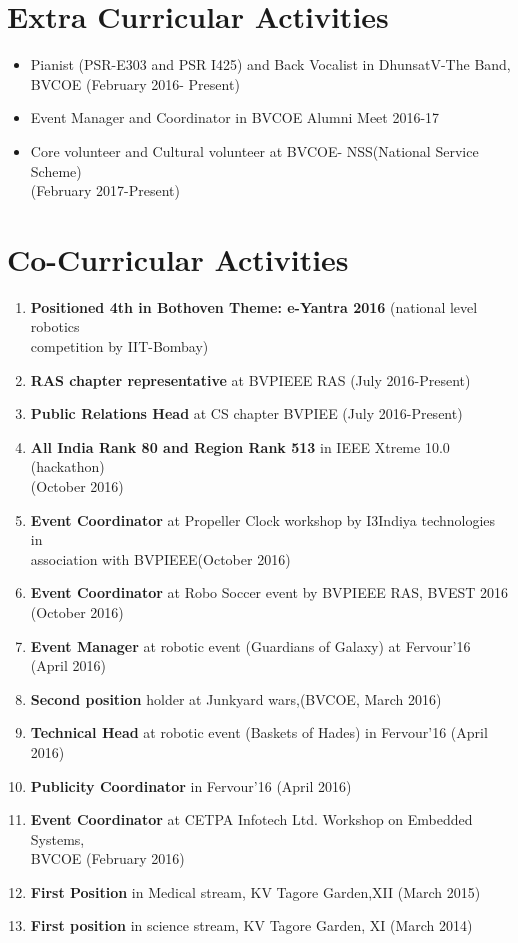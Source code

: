\documentclass[11pt]{article}
\begin{document}
\begin{minipage}{0.80\linewidth}
\section{\color{red}Ext\color{black}ra Curricular Activities}
\begin{itemize}
\item Pianist (PSR-E303 and PSR I425) and Back Vocalist in DhunsatV-The Band,\\ BVCOE (February 2016- Present)
\item Event Manager and Coordinator in BVCOE Alumni Meet 2016-17
\item Core volunteer and Cultural volunteer at BVCOE- NSS(National Service Scheme)\\ (February 2017-Present)
\end{itemize}
\section{\color{green}Co-C\color{black}urricular Activities}
\begin{enumerate}
\item \textbf{Positioned 4th in Bothoven Theme: e-Yantra 2016} (national level robotics \\competition  by IIT-Bombay) 
\item \textbf{RAS chapter representative} at BVPIEEE RAS (July 2016-Present)
\item \textbf{Public Relations Head} at CS chapter BVPIEE (July 2016-Present)
\item \textbf{All India Rank 80 and Region Rank 513} in IEEE Xtreme 10.0 (hackathon) \\(October 2016)
\item \textbf{Event Coordinator} at Propeller Clock workshop by I3Indiya technologies in \\association with BVPIEEE(October 2016)
\item \textbf{Event Coordinator} at Robo Soccer event by BVPIEEE RAS, BVEST 2016 \\(October 2016)
\item \textbf{Event Manager} at robotic event (Guardians of Galaxy) at Fervour'16 (April 2016)
\item \textbf{Second position} holder at Junkyard wars,(BVCOE, March 2016)
\item \textbf{Technical Head} at robotic event (Baskets of Hades) in Fervour'16 (April 2016)
\item \textbf{Publicity Coordinator} in Fervour'16 (April 2016)
\item \textbf{Event Coordinator} at CETPA Infotech Ltd. Workshop on Embedded Systems,\\BVCOE (February 2016)
\item \textbf{First Position} in Medical stream, KV Tagore Garden,XII (March 2015)
\item \textbf{First position} in science stream, KV Tagore Garden, XI (March 2014)
\end{enumerate}

\end{minipage}
\end{document}

